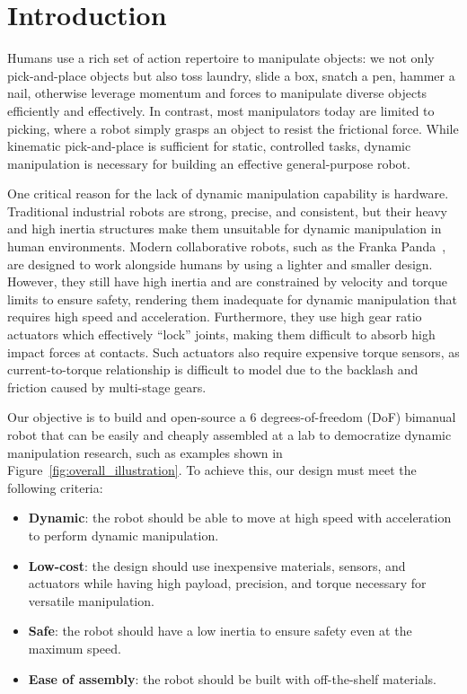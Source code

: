 \section{Introduction}

Humans use a rich set of action repertoire to manipulate objects: we not only pick-and-place objects but also toss laundry, slide a box, snatch a pen, hammer a nail, otherwise leverage momentum and forces to manipulate diverse objects efficiently and effectively. In contrast, most manipulators today are limited to picking, where a robot simply grasps an object to resist the frictional force. While kinematic pick-and-place is sufficient for static, controlled tasks, dynamic manipulation is necessary for building an effective general-purpose robot.

One critical reason for the lack of dynamic manipulation capability is hardware. Traditional industrial robots are strong, precise, and consistent, but their heavy and high inertia structures make them unsuitable for dynamic manipulation in human environments. Modern collaborative robots, such as the Franka Panda~\cite{haddadin2022franka}, are designed to work alongside humans by using a lighter and smaller design. However, they still have high inertia and are constrained by velocity and torque limits to ensure safety, rendering them inadequate for dynamic manipulation that requires high speed and acceleration. Furthermore, they use high gear ratio actuators which effectively ``lock'' joints, making them difficult to absorb high impact forces at contacts. Such actuators also require expensive torque sensors, as current-to-torque relationship is difficult to model due to the backlash and friction caused by multi-stage gears.

Our objective is to build and open-source a 6 degrees-of-freedom (DoF) bimanual robot that can be easily and cheaply assembled at a lab to democratize dynamic manipulation research, such as examples shown in Figure~\ref{fig:overall_illustration}. To achieve this, our design must meet the following criteria:

\begin{itemize}
    \item \textbf{Dynamic}: the robot should be able to move at high speed with acceleration to perform dynamic manipulation.
    \item \textbf{Low-cost}: the design should use inexpensive materials, sensors, and actuators while having high payload, precision, and torque necessary for versatile manipulation.
    \item \textbf{Safe}: the robot should have a low inertia to ensure safety even at the maximum speed.
    \item \textbf{Ease of assembly}: the robot should be built with off-the-shelf materials.
\end{itemize}

